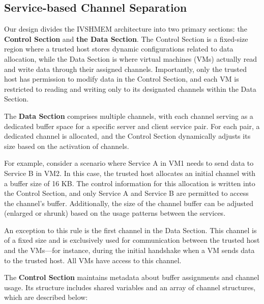 \documentclass[letterpaper,twocolumn,10pt]{article}
\begin{document}
\subsection{Service-based Channel Separation}

Our design divides the IVSHMEM architecture into two primary sections: the \textbf{Control Section} and \textbf{the Data Section}. The Control Section is a fixed-size region where a trusted host stores dynamic configurations related to data allocation, while the Data Section is where virtual machines (VMs) actually read and write data through their assigned channels. Importantly, only the trusted host has permission to modify data in the Control Section, and each VM is restricted to reading and writing only to its designated channels within the Data Section.


The \textbf{Data Section} comprises multiple channels, with each channel serving as a dedicated buffer space for a specific server and client service pair. For each pair, a dedicated channel is allocated, and the Control Section dynamically adjusts its size based on the activation of channels.

For example, consider a scenario where Service A in VM1 needs to send data to Service B in VM2. In this case, the trusted host allocates an initial channel with a buffer size of 16 KB. The control information for this allocation is written into the Control Section, and only Service A and Service B are permitted to access the channel’s buffer. Additionally, the size of the channel buffer can be adjusted (enlarged or shrunk) based on the usage patterns between the services.

An exception to this rule is the first channel in the Data Section. This channel is of a fixed size and is exclusively used for communication between the trusted host and the VMs—for instance, during the initial handshake when a VM sends data to the trusted host. All VMs have access to this channel.


The \textbf{Control Section} maintains metadata about buffer assignments and channel usage. Its structure includes shared variables and an array of channel structures, which are described below:
\end{document}
